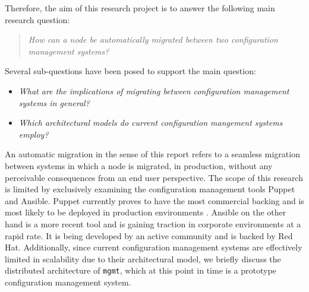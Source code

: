 Therefore, the aim of this research project is to answer the following main research question:

\begin{quote}
\textit{How can a node be automatically migrated between two configuration management systems?}
\end{quote}

\noindent
Several sub-questions have been posed to support the main question:
\begin{itemize}
    \setlength\itemsep{1pt}
    \item \textit{What are the implications of migrating between configuration management systems in general?}
    \item \textit{Which architectural models do current configuration mangement systems employ?}
\end{itemize}

\noindent
An automatic migration in the sense of this report refers to a seamless migration between systems in which a node is migrated, in production, without any perceivable consequences from an end user perspective. The scope of this research is limited by exclusively examining the configuration management tools Puppet and Ansible. Puppet currently proves to have the most commercial backing and is most likely to be deployed in production environments \cite{tecosystems_2013}. Ansible on the other hand is a more recent tool and is gaining traction in corporate environments at a rapid rate. It is being developed by an active community and is backed by Red Hat. Additionally, since current configuration management systems are effectively limited in scalability due to their architectural model, we briefly discuss the distributed architecture of \texttt{mgmt}, which at this point in time is a prototype configuration management system.
